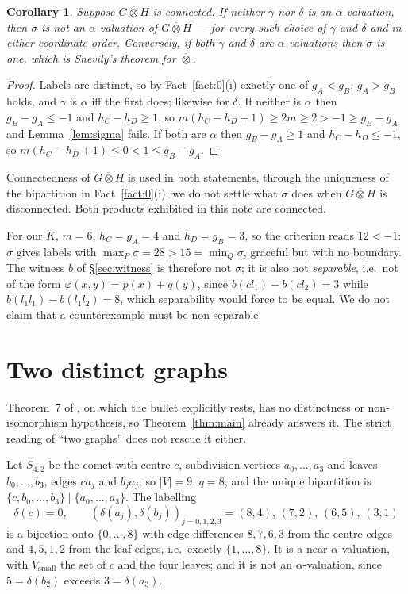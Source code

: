 \documentclass[11pt]{amsart}
\newtheorem{corollary}[theorem]{Corollary}
\theoremstyle{definition}
\theoremstyle{remark}
\newcommand{\wtp}{\mathbin{\overline{\otimes}}}
\newcommand{\Vsm}{V_{\mathrm{small}}}
\begin{document}
\begin{corollary}\label{cor:obstruction}
Suppose $G\wtp H$ is connected. If neither $\gamma$ nor $\delta$ is an
$\alpha$-valuation, then $\sigma$ is not an $\alpha$-valuation of $G\wtp H$ ---
for every such choice of $\gamma$ and $\delta$ and in either coordinate order.
Conversely, if both $\gamma$ and $\delta$ are $\alpha$-valuations then $\sigma$
is one, which is Snevily's theorem \textup{\cite{Snevily}} for $\wtp$.
\end{corollary}

\begin{proof}
Labels are distinct, so by Fact~\ref{fact:0}(i) exactly one of $g_A<g_B$,
$g_A>g_B$ holds, and $\gamma$ is $\alpha$ iff the first does; likewise for
$\delta$. If neither is $\alpha$ then $g_B-g_A\le-1$ and $h_C-h_D\ge1$, so
$m(h_C-h_D+1)\ge 2m\ge2>-1\ge g_B-g_A$ and Lemma~\ref{lem:sigma} fails. If
both are $\alpha$ then $g_B-g_A\ge1$ and $h_C-h_D\le-1$, so
$m(h_C-h_D+1)\le0<1\le g_B-g_A$.
\end{proof}

Connectedness of $G\wtp H$ is used in both statements, through the uniqueness of
the bipartition in Fact~\ref{fact:0}(i); we do not settle what $\sigma$ does when
$G\wtp H$ is disconnected. Both products exhibited in this note are connected.

For our $K$, $m=6$, $h_C=g_A=4$ and $h_D=g_B=3$, so the criterion reads
$12<-1$: $\sigma$ gives labels with $\max_P\sigma=28>15=\min_Q\sigma$, graceful
but with no boundary. The witness $b$ of \S\ref{sec:witness} is therefore not
$\sigma$; it is also not \emph{separable}, i.e.\ not of the form
$\varphi(x,y)=p(x)+q(y)$, since $b(cl_1)-b(cl_2)=3$ while
$b(l_1l_1)-b(l_1l_2)=8$, which separability would force to be equal. We do not
claim that a counterexample must be non-separable.

\section{Two distinct graphs}\label{sec:distinct}

Theorem~7 of \cite{EKV}, on which the bullet explicitly rests, has no
distinctness or non-isomorphism hypothesis, so Theorem~\ref{thm:main} already
answers it. The strict reading of ``two graphs'' does not rescue it either.

Let $S_{4,2}$ be the comet with centre $c$, subdivision vertices
$a_0,\dots,a_3$ and leaves $b_0,\dots,b_3$, edges $ca_j$ and $b_ja_j$; so
$|V|=9$, $q=8$, and the unique bipartition is
$\{c,b_0,\dots,b_3\}\mid\{a_0,\dots,a_3\}$. The labelling
\begin{equation}\label{eq:delta}
 \delta(c)=0,\qquad
 (\delta(a_j),\delta(b_j))_{j=0,1,2,3}=(8,4),\,(7,2),\,(6,5),\,(3,1)
\end{equation}
is a bijection onto $\{0,\dots,8\}$ with edge differences $8,7,6,3$ from the
centre edges and $4,5,1,2$ from the leaf edges, i.e.\ exactly $\{1,\dots,8\}$.
It is a near $\alpha$-valuation, with $\Vsm$ the set of $c$ and the four
leaves; and it is not an $\alpha$-valuation, since $5=\delta(b_2)$ exceeds
$3=\delta(a_3)$.
\end{document}
